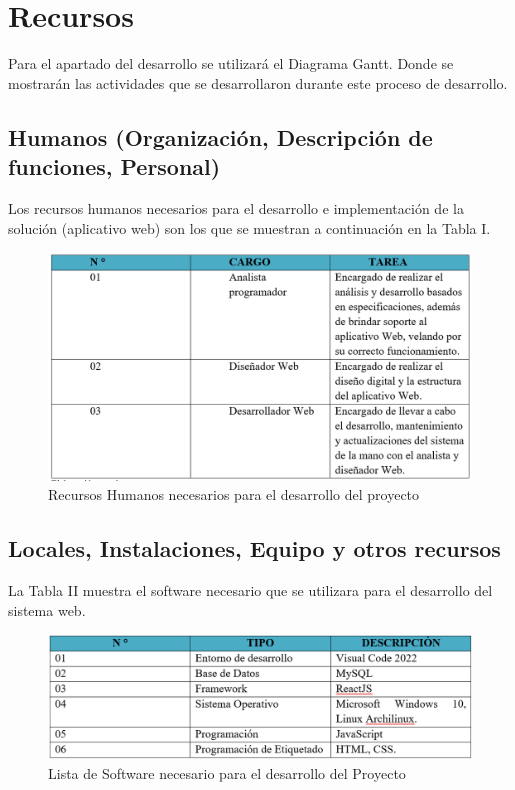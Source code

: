 \documentclass[12pt,a4paper,oneside]{article}
\begin{document}
\section{Recursos}
Para el apartado del desarrollo se utilizará el Diagrama Gantt. Donde se mostrarán las actividades que se desarrollaron durante este proceso de desarrollo. 
\subsection{Humanos (Organización, Descripción de funciones, Personal)}
Los recursos humanos necesarios para el desarrollo e implementación de la solución (aplicativo web) son los que se muestran a continuación en la Tabla I.
 \begin{figure}[H]
    \centering
    \includegraphics[width=15cm]{Recursos/a.PNG}
    \caption{Recursos Humanos necesarios para el desarrollo del proyecto}
    \label{fig:rrhhNeeded}
\end{figure}

\subsection{Locales, Instalaciones, Equipo y otros recursos}
La Tabla II muestra el software necesario que se utilizara para el desarrollo del sistema web.
\begin{figure}[H]
    \centering
    \includegraphics[width=15cm]{Recursos/b.PNG}
    \caption{Lista de Software necesario para el desarrollo del Proyecto}
    \label{fig:softwareNeeded}
\end{figure}
\end{document}

